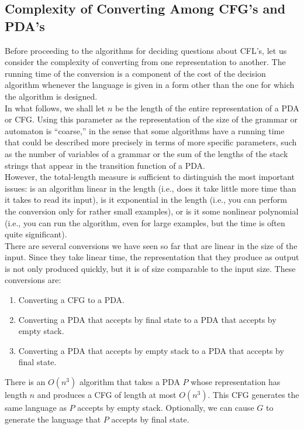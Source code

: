 \documentclass[]{article}
\begin{document}
  \subsection*{Complexity of Converting Among CFG's and PDA's}
    Before proceeding to the algorithms for deciding questions about CFL's, let
    us consider the complexity of converting from one representation to another.
    The running time of the conversion is a component of the cost of the
    decision algorithm whenever the language is given in a form other than the
    one for which the algorithm is designed. \\
    \indent In what follows, we shall let $n$ be the length of the entire
    representation of a PDA or CFG. Using this parameter as the representation
    of the size of the grammar or automaton is ``coarse,'' in the sense that
    some algorithms have a running time that could be described more precisely
    in terms of more specific parameters, such as the number of variables of a
    grammar or the sum of the lengths of the stack strings that appear in the
    transition function of a PDA. \\
    \indent However, the total-length measure is sufficient to distinguish the
    most important issues: is an algorithm linear in the length (i.e., does it
    take little more time than it takes to read its input), is it exponential in
    the length (i.e., you can perform the conversion only for rather small
    examples), or is it some nonlinear polynomial (i.e., you can run the
    algorithm, even for large examples, but the time is often quite
    significant). \\
    \indent There are several conversions we have seen so far that are linear in
    the size of the input. Since they take linear time, the representation that
    they produce as output is not only produced quickly, but it is of size
    comparable to the input size. These conversions are:
      \begin{enumerate}
        \item Converting a CFG to a PDA.
        \item Converting a PDA that accepts by final state to a PDA that accepts
        by empty stack.
        \item Converting a PDA that accepts by empty stack to a PDA that accepts
        by final state.
      \end{enumerate}
      \begin{thm}
        There is an $O(n^3)$ algorithm that takes a PDA $P$ whose representation
        has length $n$ and produces a CFG of length at most $O(n^3)$. This CFG
        generates the same language as $P$ accepts by empty stack. Optionally,
        we can cause $G$ to generate the language that $P$ accepts by final
        state.
      \end{thm}
\end{document}
